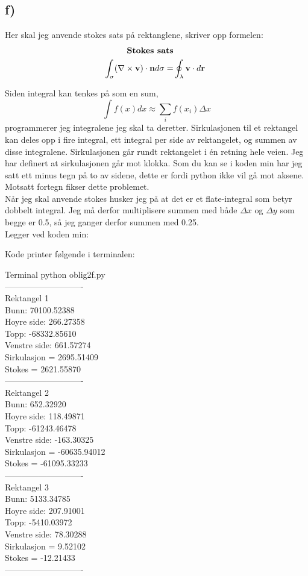 \documentclass[a4paper,12pt,norsk]{article}
\begin{document}
\subsection*{f)}
Her skal jeg anvende stokes sats på rektanglene, skriver opp formelen:
\begin{align*}
\textbf{Stokes sats}&\\
\int_{\sigma} (\nabla \times \bold{v})\cdot \bold{n}d\sigma =& \oint_{\lambda} \bold{v} \cdot d\bold{r}\
\end{align*}

Siden integral kan tenkes på som en sum, $$\int f(x)dx \approx \sum_i f(x_i) \Delta{x}$$ programmerer jeg integralene jeg skal ta deretter. Sirkulasjonen til et rektangel kan deles opp i fire integral, ett integral per side av rektangelet, og summen av disse integralene. Sirkulasjonen går rundt rektangelet i én retning hele veien. Jeg har definert at sirkulasjonen går mot klokka. Som du kan se i koden min har jeg satt ett minus tegn på to av sidene, dette er fordi python ikke vil gå mot aksene. Motsatt fortegn fikser dette problemet. \\
Når jeg skal anvende stokes husker jeg på at det er et flate-integral som betyr dobbelt integral. Jeg må derfor multiplisere summen med både $\Delta{x}$ og $\Delta{y}$ som begge er 0.5, så jeg ganger derfor summen med 0.25.\\ 
Legger ved koden min:

Kode printer følgende i terminalen:

Terminal python oblig2f.py\\
----------------------------\\
Rektangel 1\\
Bunn:         70100.52388\\
Hoyre side:   266.27358\\
Topp:         -68332.85610\\
Venstre side: 661.57274\\
Sirkulasjon = 2695.51409\\
Stokes = 2621.55870\\
----------------------------\\
Rektangel 2\\
Bunn:         652.32920\\
Hoyre side:   118.49871\\
Topp:         -61243.46478\\
Venstre side: -163.30325\\
Sirkulasjon = -60635.94012\\
Stokes = -61095.33233\\
----------------------------\\
Rektangel 3\\
Bunn:         5133.34785\\
Hoyre side:   207.91001\\
Topp:         -5410.03972\\
Venstre side: 78.30288\\
Sirkulasjon = 9.52102\\
Stokes = -12.21433\\
----------------------------\\
\end{document}
